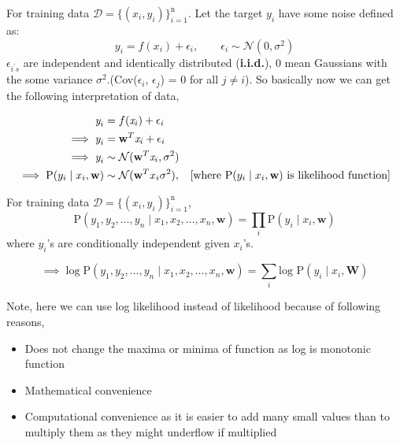 \documentclass{report}
\newcommand{\D}{\mathcal{D}}
\begin{document}
For training data $\D = \{(x_{i}, y_{i})\}^{\text{n}}_{i=1}$. Let the target $y_{i}$ have some noise defined as: $$y_{i} = f(x_{i}) + \epsilon_{i}, \qquad \epsilon_{i} \sim \mathcal{N}(0,\sigma^{2})$$
$\epsilon_{i^{'}s}$ are independent and identically distributed (\textbf{i.i.d.}), 0 mean Gaussians with the some variance $\sigma^{2}$.(Cov($\epsilon_{i}$, $\epsilon_{j}$) = 0 for all $j \neq i$).
So basically now we can get the following interpretation of data,

\begin{align*}
  \textit{y}_i                                   & = f(\textit{x}_i) + \epsilon_i                                                                                                                       \\
  \implies \textit{y}_i                          & = \textbf{w}^T\textit{x}_i + \epsilon_i                 &                                                                                            \\
  \implies \textit{y}_i                          & \sim \mathcal{N}(\textbf{w}^{T}\textit{x}_i , \sigma^2)                                                                                              \\
  \implies \text{P}(y_{i}\mid x_{i}, \textbf{w}) & \sim \mathcal{N}(\mathbf{w}^{T}x_{i} \sigma^{2}),       & \hfill \text{[where }\text{P}(y_{i}\mid x_{i}, \textbf{w}) \text{ is likelihood function]}
\end{align*}

For training data $\D = \{(\mathit{x}_{i}, \mathit{y}_{i})\}^{\text{n}}_{i=1}$,
$$
  \text{P}(y_{1}, y_{2}, \ldots, y_{n}\mid x_{1}, x_{2}, \ldots, x_{n}, \textbf{w}) = \prod_{i}\text{P}(y_{i}\mid x_{i}, \textbf{w})
$$
where $y_{i}$'s are conditionally independent given $x_{i}$'s.

$$
  \implies \log\text{P}(y_{1}, y_{2}, \ldots, y_{n}\mid x_{1}, x_{2}, \ldots, x_{n}, \textbf{w}) = \sum_{i}\text{log P}(y_{i} \mid x_{i}, \textbf{W})
$$

Note, here we can use log likelihood instead of likelihood because of following reasons,
\begin{itemize}
  \item Does not change the maxima or minima of function as log is monotonic function
  \item Mathematical convenience
  \item Computational convenience as it is easier to add many small values than to multiply them as they might underflow if multiplied
\end{itemize}
\end{document}
